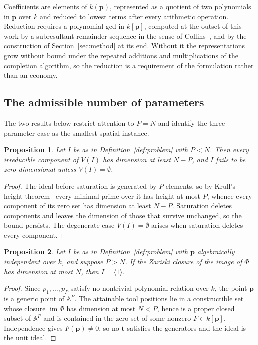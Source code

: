 \documentclass[11pt,a4paper]{article}
\theoremstyle{plain}
\newtheorem{proposition}{Proposition}
\theoremstyle{definition}
\theoremstyle{remark}
\newcommand{\Aff}{\mathbb{A}}
\newcommand{\bp}{\boldsymbol{p}}
\newcommand{\bt}{\boldsymbol{t}}
\begin{document}
Coefficients are elements of $k(\bp)$, represented as a quotient of two polynomials in $\bp$ over $k$
and reduced to lowest terms after every arithmetic operation. Reduction requires a polynomial gcd in
$k[\bp]$, computed at the outset of this work by a subresultant remainder sequence in the sense of
Collins~\cite{collins1967}, and by the construction of Section~\ref{sec:method} at its end.
Without it the representations grow without bound under the repeated additions and multiplications of
the completion algorithm, so the reduction is a requirement of the formulation rather than an
economy.

\subsection{The admissible number of parameters}

The two results below restrict attention to $P = N$ and identify the three-parameter case as the
smallest spatial instance.

\begin{proposition}
\label{prop:under}
Let $I$ be as in Definition~\ref{def:problem} with $P < N$. Then every irreducible component of
$V(I)$ has dimension at least $N - P$, and $I$ fails to be zero-dimensional unless
$V(I) = \emptyset$.
\end{proposition}

\begin{proof}
The ideal before saturation is generated by $P$ elements, so by Krull's height
theorem~\cite[Ch.~10]{eisenbud} every minimal prime over it has height at most $P$, whence every
component of its zero set has dimension at least $N - P$. Saturation deletes components and leaves
the dimension of those that survive unchanged, so the bound persists. The degenerate case
$V(I) = \emptyset$ arises when saturation deletes every component.
\end{proof}

\begin{proposition}
\label{prop:over}
Let $I$ be as in Definition~\ref{def:problem} with $\bp$ algebraically independent over $k$, and
suppose $P > N$. If the Zariski closure of the image of $\Phi$ has dimension at most $N$, then
$I = \langle 1 \rangle$.
\end{proposition}

\begin{proof}
Since $p_1,\dots,p_P$ satisfy no nontrivial polynomial relation over $k$, the point $\bp$ is a generic
point of $\Aff^P$. The attainable tool positions lie in a constructible set whose closure
$\overline{\operatorname{im}\Phi}$ has dimension at most $N < P$, hence is a proper closed subset of
$\Aff^P$ and is contained in the zero set of some nonzero $F \in k[\bp]$. Independence gives
$F(\bp) \neq 0$, so no $\bt$ satisfies the generators and the ideal is the unit ideal.
\end{proof}
\end{document}
